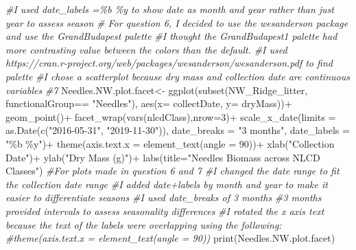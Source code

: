 \documentclass[
]{article}
\newenvironment{Shaded}{\begin{snugshade}}{\end{snugshade}}
\newcommand{\AttributeTok}[1]{\textcolor[rgb]{0.77,0.63,0.00}{#1}}
\newcommand{\CommentTok}[1]{\textcolor[rgb]{0.56,0.35,0.01}{\textit{#1}}}
\newcommand{\DecValTok}[1]{\textcolor[rgb]{0.00,0.00,0.81}{#1}}
\newcommand{\FunctionTok}[1]{\textcolor[rgb]{0.00,0.00,0.00}{#1}}
\newcommand{\NormalTok}[1]{#1}
\newcommand{\OtherTok}[1]{\textcolor[rgb]{0.56,0.35,0.01}{#1}}
\newcommand{\SpecialCharTok}[1]{\textcolor[rgb]{0.00,0.00,0.00}{#1}}
\newcommand{\StringTok}[1]{\textcolor[rgb]{0.31,0.60,0.02}{#1}}
\begin{document}
\begin{Shaded}
\begin{Highlighting}[]
\CommentTok{\#I used date\_labels =\%b \%y to show date as month and year rather than just year to assess season}
\CommentTok{\# For question 6, I decided to use the wesanderson package and use the GrandBudapest palette}
\CommentTok{\#I thought the GrandBudapest1 palette had more contrasting value between the colors than the default.}
\CommentTok{\#I used https://cran.r{-}project.org/web/packages/wesanderson/wesanderson.pdf to find palette}
\CommentTok{\#I chose a scatterplot because dry mass and collection date are continuous variables}
\CommentTok{\#7}
\NormalTok{Needles.NW.plot.facet}\OtherTok{\textless{}{-}} \FunctionTok{ggplot}\NormalTok{(}\FunctionTok{subset}\NormalTok{(NW\_Ridge\_litter, functionalGroup}\SpecialCharTok{==} \StringTok{"Needles"}\NormalTok{),}
                               \FunctionTok{aes}\NormalTok{(}\AttributeTok{x=}\NormalTok{ collectDate, }\AttributeTok{y=}\NormalTok{ dryMass))}\SpecialCharTok{+}
                               \FunctionTok{geom\_point}\NormalTok{()}\SpecialCharTok{+}
                               \FunctionTok{facet\_wrap}\NormalTok{(}\FunctionTok{vars}\NormalTok{(nlcdClass),}\AttributeTok{nrow=}\DecValTok{3}\NormalTok{)}\SpecialCharTok{+}
                               \FunctionTok{scale\_x\_date}\NormalTok{(}\AttributeTok{limits =} \FunctionTok{as.Date}\NormalTok{(}\FunctionTok{c}\NormalTok{(}\StringTok{"2016{-}05{-}31"}\NormalTok{, }\StringTok{"2019{-}11{-}30"}\NormalTok{)), }
                               \AttributeTok{date\_breaks =} \StringTok{"3 months"}\NormalTok{, }\AttributeTok{date\_labels =} \StringTok{"\%b \%y"}\NormalTok{)}\SpecialCharTok{+}
                               \FunctionTok{theme}\NormalTok{(}\AttributeTok{axis.text.x =} \FunctionTok{element\_text}\NormalTok{(}\AttributeTok{angle =} \DecValTok{90}\NormalTok{))}\SpecialCharTok{+}
                               \FunctionTok{xlab}\NormalTok{(}\StringTok{"Collection Date"}\NormalTok{)}\SpecialCharTok{+}
                               \FunctionTok{ylab}\NormalTok{(}\StringTok{"Dry Mass (g)"}\NormalTok{)}\SpecialCharTok{+}
                               \FunctionTok{labs}\NormalTok{(}\AttributeTok{title=}\StringTok{"Needles Biomass across NLCD Classes"}\NormalTok{)}
\CommentTok{\#For plots made in question 6 and 7}
\CommentTok{\#I changed the date range to fit the collection date range}
\CommentTok{\#I added date+labels by month and year to make it easier to differentiate seasons }
\CommentTok{\#I used date\_breaks of 3 months}
\CommentTok{\#3 months provided intervals to assess seasonality differences}
\CommentTok{\#I rotated the x axis text because the text of the labels were overlapping using the following:}
\CommentTok{\#theme(axis.text.x = element\_text(angle = 90))}
\FunctionTok{print}\NormalTok{(Needles.NW.plot.facet)}
\end{Highlighting}
\end{Shaded}
\end{document}
